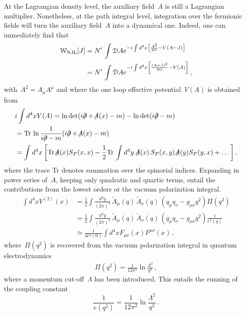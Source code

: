 \documentclass[reqno,11pt]{amsart}
\numberwithin{equation}{section}
\newcommand{\1}{\mbox{\rm 1 \hspace{-1.05 em} 1}}
\newcommand{\Pdd}{\mbox{$\partial$ \hspace{-1.2 em} $/$}}
\begin{document}
\begin{enumerate}[leftmargin=2em]
At the Lagrangian density level, the auxiliary field~$A$ is still a Lagrangian multiplier. Nonetheless, at the path integral level, integration over the fermionic fields will turn the auxiliary field~$A$ into a dynamical one. Indeed, one can immediately find that
\begin{align*}
\mathcal{W}_{\rm NJL}[J] &= N' \, \int \mathcal{D} A e^{- i \int d^4x \left[ \frac{A^2}{2G} - V(A-J) \right] } \\
&= N' \, \int \mathcal{D} A e^{- i \int d^4x \left[ \frac{(A+J)^2 }{2G} - V(A) \right] } \,, \nonumber
\end{align*}
with~$A^2= A_\mu A^\mu$ and where the one loop effective potential~$V(A)$ is obtained from 
\begin{align*}
& i \int  d^4 x V(A) = \ln {\rm det} (i \Pdd + \slash \!\!\!\! A(x) -m) - \ln {\rm det} (i \Pdd  -m) \\
&= {\rm Tr}\, \ln \frac{1}{i \Pdd-m} (i \Pdd + \slash \!\!\!\! A(x) -m) \\
&= \int d^4x\: \bigg[  {\rm Tr}\, \slash \!\!\!\! A(x) S_{F}(x,x) -\frac{1}{2} {\rm Tr} \,\int d^4 y\,\, \slash \!\!\!\! A(x) \, S_{F}(x,y)  \, \slash \!\!\!\! A(y) S_{F}(y,x) + \dots \bigg] \,,
\end{align*}
where the trace Tr denotes summation over the spinorial indices. Expanding in power series of~$A$, keeping only quadratic and quartic terms, entail the contributions from the lowest orders or the vacuum polarization integral.  
\begin{align*}
\int d^4 x V^{(2)}(x)
&= \frac{1}{2} \int \frac{d^4 q}{(2\pi)^4} \, \tilde{A}_\mu (q)  \, \tilde{A}_\nu (q) \, \left( q_\mu q_\nu  - g_{\mu \nu} q^2 \right) \Pi(q^2) \\
&= \frac{1}{2} \int \frac{d^4 q}{(2\pi)^4} \, \tilde{A}_\mu (q)  \, \tilde{A}_\nu (q) \, \left( q_\mu q_\nu  - g_{\mu \nu} q^2 \right) \frac{1}{e^2(q)} \\
&\simeq \frac{1}{4 e^2(0)} \int d^4 x F_{\mu \nu} (x) F^{\mu \nu} (x)\,,
 \end{align*}
where~$\Pi(q^2)$ is recovered from the vacuum polarization integral in quantum electrodynamics 
\begin{eqnarray}
\Pi(q^2)=\frac{1}{12\pi^2} \ln \frac{\Lambda^2}{q^2} 
\,,
 \end{eqnarray}
where a momentum cut-off~$\Lambda$ has been introduced. This entails the running of the coupling constant 
\[ \frac{1}{e(q^2)}=\frac{1}{12\pi^2} \ln \frac{\Lambda^2}{q^2} \:. \]


\end{enumerate}
\end{document}
